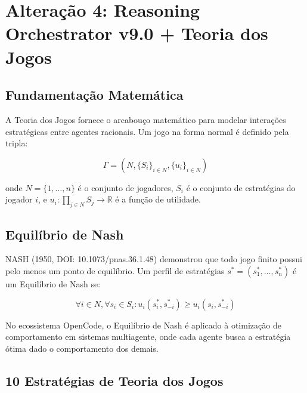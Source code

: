 \documentclass[12pt,a4paper]{article}
\begin{document}
\section{Alteração 4: Reasoning Orchestrator v9.0 + Teoria dos Jogos}

\subsection{Fundamentação Matemática}

A Teoria dos Jogos fornece o arcabouço matemático para modelar interações estratégicas entre agentes racionais. Um jogo na forma normal é definido pela tripla:

\begin{equation}
  \Gamma = (N, \{S_i\}_{i \in N}, \{u_i\}_{i \in N})
\end{equation}

onde $N = \{1, \ldots, n\}$ é o conjunto de jogadores, $S_i$ é o conjunto de estratégias do jogador $i$, e $u_i: \prod_{j \in N} S_j \to \mathbb{R}$ é a função de utilidade.

\subsection{Equilíbrio de Nash}

NASH (1950, DOI: 10.1073/pnas.36.1.48) demonstrou que todo jogo finito possui pelo menos um ponto de equilíbrio. Um perfil de estratégias $s^* = (s_1^*, \ldots, s_n^*)$ é um Equilíbrio de Nash se:

\begin{equation}
  \forall i \in N, \forall s_i \in S_i: u_i(s_i^*, s_{-i}^*) \geq u_i(s_i, s_{-i}^*)
\end{equation}

No ecossistema OpenCode, o Equilíbrio de Nash é aplicado à otimização de comportamento em sistemas multiagente, onde cada agente busca a estratégia ótima dado o comportamento dos demais.

\subsection{10 Estratégias de Teoria dos Jogos}
\end{document}

